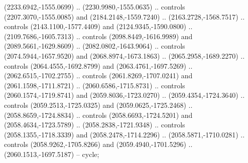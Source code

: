 \begin{scope}[shift={(-24.70323,-217.37029)}]
\begin{scope}[shift={(-1886.1309,2235.3934)}]
\begin{scope}[cm={{0.7306,0.0,0.0,0.7306,(600.13913,-463.70343)}}]
        (2233.6942,-1555.0699) .. (2230.9980,-1555.0635) .. controls
        (2207.3070,-1555.0085) and (2184.2148,-1559.7240) .. (2163.2728,-1568.7517) ..
        controls (2143.1100,-1577.4409) and (2124.9345,-1590.0800) ..
        (2109.7686,-1605.7313) .. controls (2098.8449,-1616.9989) and
        (2089.5661,-1629.8609) .. (2082.0802,-1643.9064) .. controls
        (2074.5944,-1657.9520) and (2068.8974,-1673.1863) .. (2065.2958,-1689.2270) ..
        controls (2064.4555,-1692.8799) and (2063.4761,-1697.5269) ..
        (2062.6515,-1702.2755) .. controls (2061.8269,-1707.0241) and
        (2061.1598,-1711.8721) .. (2060.6586,-1715.8731) .. controls
        (2060.1574,-1719.8741) and (2059.8036,-1723.0270) .. (2059.4354,-1724.3640) ..
        controls (2059.2513,-1725.0325) and (2059.0625,-1725.2468) ..
        (2058.8659,-1724.8834) .. controls (2058.6693,-1724.5201) and
        (2058.4634,-1723.5789) .. (2058.2838,-1721.9348) .. controls
        (2058.1355,-1718.3339) and (2058.2478,-1714.2296) .. (2058.5871,-1710.0281) ..
        controls (2058.9262,-1705.8266) and (2059.4940,-1701.5296) ..
        (2060.1513,-1697.5187) -- cycle;


\end{scope}
\end{scope}
\end{scope}
